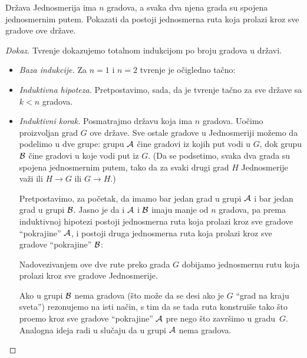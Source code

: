 \begin{EX}
  Dr\v zava Jednosmerija ima $n$ gradova, a svaka dva njena grada su spojena jednosmernim putem.
  Pokazati da postoji jednosmerna ruta koja prolazi kroz sve gradove ove dr\v zave.
\end{EX}
\begin{proof}[Dokaz]
  Tvr\dj enje dokazujemo totalnom indukcijom po broju gradova u dr\v zavi.
  \begin{itemize}
    \item \emph{Baza indukcije.} Za $n = 1$ i $n = 2$ tvr\dj enje je o\v cigledno ta\v cno:
      \begin{center}
        
      \end{center}
    \item \emph{Induktivna hipoteza.}
      Pretpostavimo, sada, da je tvr\dj enje ta\v cno za sve dr\v zave sa $k < n$ gradova.
    \item \emph{Induktivni korak.} Posmatrajmo dr\v zavu koja ima $n$ gradova.
      Uo\v cimo proizvoljan grad $G$ ove dr\v zave. Sve ostale gradove u Jednosmeriji mo\v zemo da podelimo u dve grupe:
      grupu $\mathcal{A}$ \v cine gradovi iz kojih put vodi u $G$, dok grupu $\mathcal{B}$ \v cine gradovi u koje vodi put iz $G$.
      (Da se podsetimo, svaka dva grada su spojena jednosmernim putem, tako da za svaki drugi grad $H$ Jednosmerije
      va\v zi ili $H \to G$ ili $G \to H$.)
      \begin{center}
        
      \end{center}
      Pretpostavimo, za po\v cetak, da imamo bar jedan grad u grupi $\mathcal{A}$ i bar jedan grad u grupi $\mathcal{B}$.
      Jasno je da i $\mathcal{A}$ i $\mathcal{B}$ imaju manje od $n$ gradova, pa prema induktivnoj hipotezi
      postoji jednosmerna ruta koja prolazi kroz sve gradove \enquote{pokrajine} $\mathcal{A}$, i postoji druga
      jednosmerna ruta koja prolazi kroz sve gradove \enquote{pokrajine} $\mathcal{B}$:
      \begin{center}
        
      \end{center}
      Nadovezivanjem ove dve rute preko grada $G$ dobijamo jednosmernu rutu koja prolazi kroz sve gradove Jednosmerije.
      
      \hspace*{1.5em}Ako u grupi $\mathcal{B}$ nema gradova (\v sto mo\v ze da se desi ako je $G$ \enquote{grad na kraju sveta})
      rezonujemo na isti na\v cin, s tim da se tada ruta konstrui\v se tako \v sto pro\dj emo kroz sve gradove \enquote{pokrajine} $\mathcal{A}$
      pre nego \v sto zavr\v simo u gradu~$G$. Analogna ideja radi u slu\v caju da u grupi $\mathcal{A}$ nema gradova.
      \qedhere
    \end{itemize}
\end{proof}

